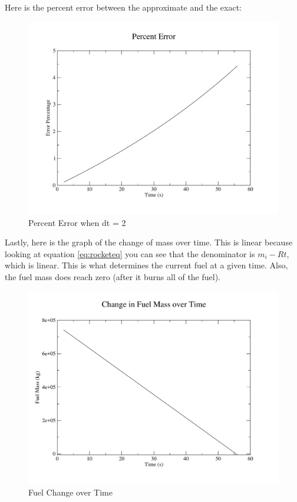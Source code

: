\documentclass[11pt]{article}
\begin{document}
\newpage
Here is the percent error between the approximate and the exact:
\begin{figure}[H]
\centering
\includegraphics[scale=0.45]{error.pdf}
\caption{Percent Error when dt = 2}
\end{figure}
\newpage
Lastly, here is the graph of the change of mass over time. This is linear because looking at equation \eqref{eq:rocketeq} you can see that the denominator is $m_i - Rt$, which is linear. This is what determines the current fuel at a given time. Also, the fuel mass does reach zero (after it burns all of the fuel).

\begin{figure}[H]
\centering
\includegraphics[scale=0.45]{fuelMassChange.pdf}
\caption{Fuel Change over Time}
\end{figure}
\end{document}
